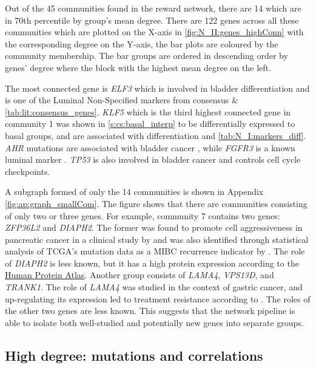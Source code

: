Out of the 45 communities found in the reward network, there are 14 which are in 70th percentile by group's mean degree. There are 122 genes across all these communities which are plotted on the X-axis in \cref{fig:N_II:genes_highConn} with the corresponding degree on the Y-axis, the bar plots are coloured by the community membership. The bar groups are ordered in descending order by genes' degree where the block with the highest mean degree on the left.



The most connected gene is \textit{ELF3} which is involved in bladder differentiation and is one of the Luminal Non-Specified markers from consensus \citet{Kamoun2020-tj} \& \cref{tab:lit:consensus_genes}. \textit{KLF5} which is the third highest connected gene in community 1 was shown in \cref{s:cs:basal_interp} to be differentially expressed to basal groups, and are associated with differentiation \cite{} and \cref{tab:N_I:markers_diff}.  \textit{AHR} mutations are associated with bladder cancer \cite{}, while \textit{FGFR3} is a known luminal marker \citet{Robertson2017-mg}. \textit{TP53} is also involved in bladder cancer \citet{Robertson2017-mg} and controls cell cycle checkpoints.


A subgraph formed of only the 14 communities is shown in Appendix \cref{fig:ap:graph_smallCom}. The figure shows that there are communities consisting of only two or three genes. For example, community 7 contains two genes: \textit{ZFP36L2} and \textit{DIAPH2}. The former was found to promote cell aggressiveness in pancreatic cancer in a clinical study by \citet{Yonemori2017-ky} and was also identified through statistical analysis of TCGA's mutation data as a MIBC recurrence indicator by \citet{Han2019-ma}. The role of \textit{DIAPH2} is less known, but it has a high protein expression according to the \href{https://www.proteinatlas.org/ENSG00000147202-DIAPH2/tissue}{Human Protein Atlas}. Another group consists of \textit{LAMA4}, \textit{VPS13D}, and \textit{TRANK1}. The role of \textit{LAMA4} was studied in the context of gastric cancer, and up-regulating its expression led to treatment resistance according to \citet{Peng2020-xe}. The roles of the other two genes are less known. This suggests that the network pipeline is able to isolate both well-studied and potentially new genes into separate groups.


\subsection{High degree: mutations and correlations} \label{s:N_II:corr_mut_burden}

